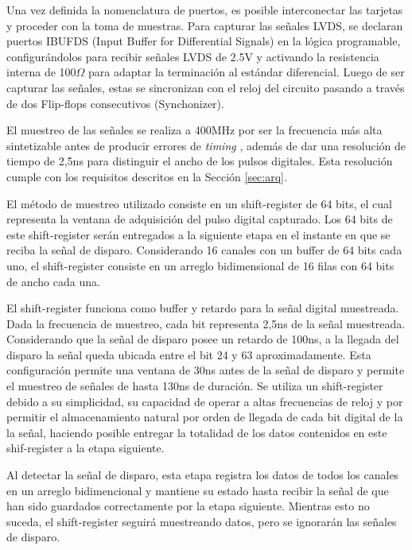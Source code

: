 	Una vez definida la nomenclatura de puertos, es posible interconectar las tarjetas y proceder con la toma de muestras. Para capturar las señales LVDS, se declaran puertos IBUFDS (Input Buffer for Differential Signals) \cite{Xilinx2012XilinxDesigns} en la lógica programable, configurándolos para recibir señales LVDS de 2.5V y activando la resistencia interna de 100$\Omega$ para adaptar la terminación al estándar diferencial. Luego de ser capturar las señales, estas se sincronizan con el reloj del circuito pasando a través de dos Flip-flops consecutivos (Synchonizer).
	
	El muestreo  de las señales se realiza a 400MHz por ser la frecuencia más alta sintetizable antes de producir errores de \textit{timing} , además de dar una resolución de tiempo de 2,5ns para distinguir el ancho de los pulsos digitales. Esta resolución cumple con los requisitos descritos en la Sección \ref{sec:arq}.
	
	El método de muestreo utilizado consiste en un shift-register de 64 bits, el cual representa la ventana de adquisición del pulso digital capturado. Los 64 bits de este shift-register serán entregados a la siguiente etapa en el instante en que se reciba la señal de disparo. Considerando 16 canales con un buffer de 64 bits cada uno, el shift-register consiste en un arreglo bidimensional de 16 filas con 64 bits de ancho cada una.
	
	El shift-register funciona como buffer y retardo para la señal digital muestreada. Dada la frecuencia de muestreo, cada bit representa 2,5ns de la señal muestreada. Considerando que la señal de disparo posee un retardo de 100ns, a la llegada del disparo la señal queda ubicada entre el bit 24 y 63 aproximadamente. Esta configuración permite una ventana de 30ns antes de la señal de disparo y permite el muestreo de señales de hasta 130ns de duración. Se utiliza un shift-register debido a su simplicidad, su capacidad de operar a altas frecuencias de reloj y por permitir el almacenamiento natural por orden de llegada de cada bit digital de la la señal, haciendo posible entregar la totalidad de los datos contenidos en este shif-register a la etapa siguiente.
	
	Al detectar la señal de disparo, esta etapa registra los datos de todos los canales en un arreglo bidimencional y mantiene su estado hasta recibir la señal de que han sido guardados correctamente por la etapa siguiente. Mientras esto no suceda, el shift-register seguirá muestreando datos, pero se ignorarán las señales de disparo.
	
